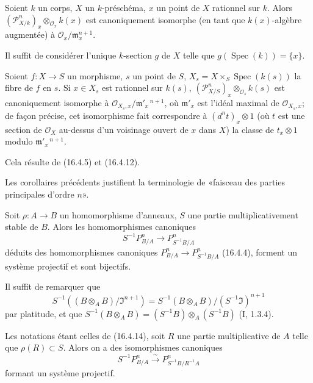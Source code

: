 \begin{corollary}[16.4.12]
\label{IV.16.4.12}
Soient $k$ un corps, $X$ un $k$-préschéma, $x$ un point de $X$ rationnel sur
$k$. Alors $(\mathscr{P}_{X/k}^n)_x\otimes_{\mathcal{O}_x}k(x)$ est
canoniquement isomorphe (en tant que $k(x)$-algèbre augmentée) à
$\mathcal{O}_x/\mathfrak{m}_x^{n+1}$.
\end{corollary}

Il suffit de considérer l'unique $k$-section $g$ de $X$ telle que
$g(\operatorname{Spec}(k))=\{x\}$.

\begin{corollary}[16.4.13]
\label{IV.16.4.13}
Soient $f:X\to S$ un morphisme, $s$ un point de $S$,
$X_s=X\times_S\operatorname{Spec}(k(s))$ la fibre de $f$ en $s$. Si
$x\in X_s$ est rationnel sur $k(s)$,
$(\mathscr{P}_{X/S}^n)_x\otimes_{\mathcal{O}_s}k(s)$ est canoniquement
isomorphe à $\mathcal{O}_{X_s,x}/\mathfrak{m}'_x{}^{\,n+1}$, où
$\mathfrak{m}'_x$ est l'idéal maximal de $\mathcal{O}_{X_s,x}$; de façon
précise, cet isomorphisme fait correspondre à $(d^n t)_x\otimes1$ (où $t$ est
une section de $\mathcal{O}_X$ au-dessus d'un voisinage ouvert de $x$ dans
$X$) la classe de $t_x\otimes1$ modulo $\mathfrak{m}'_x{}^{\,n+1}$.
\end{corollary}

Cela résulte de (16.4.5) et (16.4.12).

Les corollaires précédents justifient la terminologie de «faisceau des parties
principales d'ordre $n$».

\begin{proposition}[16.4.14]
\label{IV.16.4.14}
Soit $\rho:A\to B$ un homomorphisme d'anneaux, $S$ une partie
multiplicativement stable de $B$. Alors les homomorphismes canoniques
\[
  S^{-1}P_{B/A}^n\longrightarrow P_{S^{-1}B/A}^n
  \tag{16.4.14.1}
  \label{IV.16.4.14.1}
\]
déduits des homomorphismes canoniques
$P_{B/A}^n\to P_{S^{-1}B/A}^n$ (16.4.4), forment un système projectif et sont
bijectifs.
\end{proposition}

Il suffit de remarquer que
\[
  S^{-1}((B\otimes_A B)/\mathfrak{I}^{n+1})
  =S^{-1}(B\otimes_A B)/(S^{-1}\mathfrak{I})^{n+1}
\]
par platitude, et que
$S^{-1}(B\otimes_A B)=(S^{-1}B)\otimes_A(S^{-1}B)$ (I, 1.3.4).

\begin{corollary}[16.4.15]
\label{IV.16.4.15}
Les notations étant celles de (16.4.14), soit $R$ une partie multiplicative de
$A$ telle que $\rho(R)\subset S$. Alors on a des isomorphismes canoniques
\[
  S^{-1}P_{B/A}^n\xrightarrow{\sim}P_{S^{-1}B/R^{-1}A}^n
  \tag{16.4.15.1}
  \label{IV.16.4.15.1}
\]
formant un système projectif.
\end{corollary}


